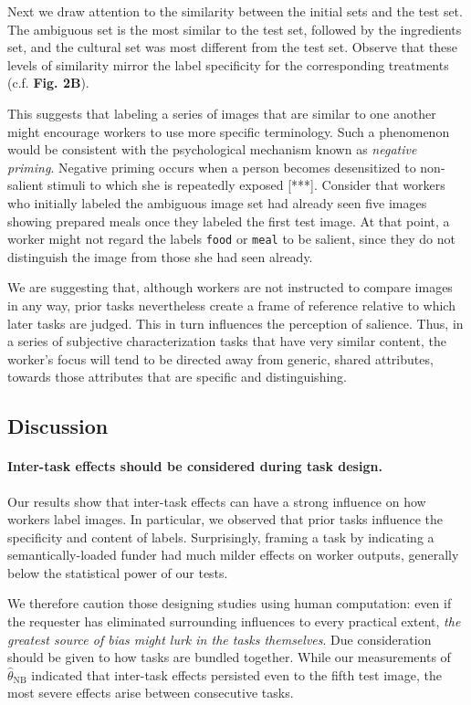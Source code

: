 \documentclass[a4paper]{report}
\begin{document}
Next we draw attention to the similarity between the initial sets and the test 
set.  The ambiguous set is the most similar to the test set, followed by the
ingredients set, and the cultural set was most different from the test set.
Observe that these levels of similarity mirror the label specificity for the 
corresponding treatments (c.f. \textbf{Fig. 2B}).  

This suggests that labeling a series of images that are similar to 
one another might encourage workers to use more specific terminology.
Such a phenomenon would be consistent with the psychological mechanism known 
as \textit{negative priming}.  Negative priming occurs when a person becomes 
desensitized to non-salient stimuli to which she is repeatedly 
exposed [***].  Consider that workers who initially 
labeled the ambiguous image set had already seen five images showing 
prepared meals once they labeled the first test image.  At that point,
a worker might not regard the labels \texttt{food} or \texttt{meal} to be 
salient, since they do not distinguish the image from those she had seen 
already.

We are suggesting that, although workers are not instructed to compare
images in any way, prior tasks nevertheless create a frame of reference
relative to which later tasks are judged.  This in turn 
influences the perception of salience. Thus, in a series of subjective 
characterization tasks that have very similar content, the worker's focus 
will tend to be directed away from generic, shared attributes, towards those 
attributes that are specific and distinguishing.


\subsection*{Discussion}

\paragraph{Inter-task effects should be considered during task design.}  
Our results show that inter-task effects can have a strong influence on how
workers label images.  In particular, we observed that prior tasks influence
the specificity and content of labels.  Surprisingly, framing a task by 
indicating a semantically-loaded funder had much milder effects on worker 
outputs, generally below the statistical power of our tests.

We therefore caution those designing studies using human computation: even if 
the requester has eliminated surrounding influences to every practical extent, 
\textit{the greatest source of bias might lurk in the tasks themselves}.
Due consideration should be given to how tasks are bundled together.
While our measurements of $\hat{\theta}_\text{NB}$ indicated that inter-task 
effects persisted even to the fifth test image, the most severe effects arise 
between consecutive tasks.
\end{document}
